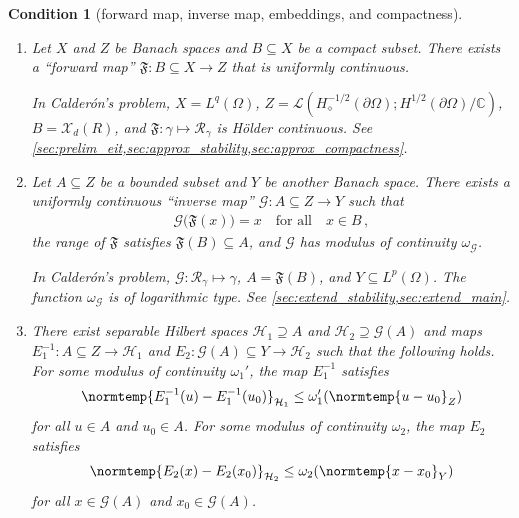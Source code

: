 \documentclass[pdflatex,sn-mathphys-num]{sn-jnl-preprint}
\newcommand{\C}{\mathbb{C}}
\newcommand{\cH}{\mathcal{H}}
\newcommand{\cX}{\mathcal{X}}
\newcommand{\cG}{\mathcal{G}}
\newcommand{\sL}{\mathscr{L}}
\newcommand{\pOmega}{{\partial\Omega}}
\newcommand{\ntd}{\mathscr{R}_{\gamma}}
\newcommand{\norm}{\normtemp}
\def\qfa{\quad\text{for all}\quad}
\theoremstyle{thmstyleone}%
\theoremstyle{thmstyletwo}%
\theoremstyle{thmstylethree}%
\newtheorem{condition}{Condition}%
\numberwithin{equation}{section}
\numberwithin{theorem}{section}
\begin{document}
\begin{condition}[forward map, inverse map, embeddings, and compactness]\label{condition:general}
    \phantom{The}
	\begin{enumerate}[label=(\roman*),leftmargin=1.25\parindent,topsep=1.67ex,itemsep=0.5ex,partopsep=1ex,parsep=1ex]
		\item Let $X$ and $Z$ be Banach spaces and $B\subseteq X$ be a compact subset. There exists a ``forward map'' $\mathfrak{F}\colon B\subseteq X\to Z$ that is uniformly continuous.

        \emph{In Calder\'on's problem, $X=L^q(\Omega)$, $Z=\sL(H^{-1/2}_\diamond(\pOmega);H_{\phantom{\diamond}}^{1/2}(\pOmega)/\C)$, $B=\cX_d(R)$, and $\mathfrak{F}\colon \gamma\mapsto \ntd$ is H\"older continuous. See \cref{sec:prelim_eit,sec:approx_stability,sec:approx_compactness}.}
		
		\item Let $A\subseteq Z$ be a bounded subset and $Y$ be another Banach space. There exists a uniformly continuous ``inverse map'' $\cG \colon A\subseteq Z\to Y$ such that 
		\begin{align}
			\cG\bigl(\mathfrak{F}(x)\bigr)=x \qfa x\in B\,,
		\end{align}
		the range of $\mathfrak{F}$ satisfies $\mathfrak{F}(B)\subseteq A$, and $\cG$ has modulus of continuity $\omega_{\cG}$.

        \emph{In Calder\'on's problem, $\cG\colon \ntd \mapsto \gamma$, $A=\mathfrak{F}(B)$, and $Y\subseteq L^p(\Omega)$. The function $\omega_{\cG}$ is of logarithmic type. See \cref{sec:extend_stability,sec:extend_main}.}
		
		\item There exist separable Hilbert spaces $\cH_1\supseteq A$ and $\cH_2\supseteq \cG(A)$ and maps $E_1^{-1}\colon {A\subseteq Z}\to \cH_1$ and $E_2\colon {\cG(A)\subseteq Y}\to \cH_2$ such that the following holds. For some modulus of continuity $\omega_1'$, the map $E_1^{-1}$ satisfies
		\begin{align}
			\norm{E_1^{-1}(u)-E_1^{-1}(u_0)}_{\cH_1}\leq \omega_1'(\norm{u-u_0}_Z)
		\end{align}
        for all $u\in A$ and $u_0\in A$.
		For some modulus of continuity $\omega_2$, the map $E_2$ satisfies
		\begin{align}
			\norm{E_2(x)-E_2(x_0)}_{\cH_2}\leq \omega_2(\norm{x-x_0}_Y)
		\end{align}
        for all $x\in \cG(A)$ and $x_0\in \cG(A)$. 
        

\end{enumerate}
\end{condition}
\end{document}
